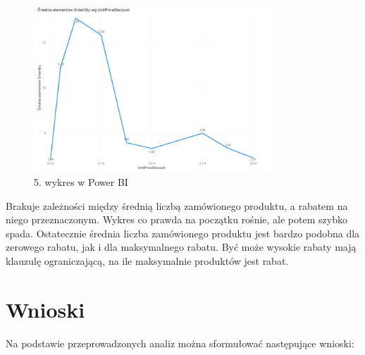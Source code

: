 \documentclass[a4paper,12pt]{article}
\begin{document}
\begin{figure}[H]
    \centering
    \includegraphics[width=0.8\textwidth]{images/power_bi/05.png}
    \caption{5. wykres w Power BI}
\end{figure}

Brakuje zależności między średnią liczbą zamówionego produktu, a rabatem na niego przeznaczonym. Wykres co prawda na początku rośnie, ale potem szybko spada. Ostatecznie średnia liczba zamówionego produktu jest bardzo podobna dla zerowego rabatu, jak i dla maksymalnego rabatu. Być może wysokie rabaty mają klauzulę ograniczającą, na ile maksymalnie produktów jest rabat.

\section{Wnioski}

Na podstawie przeprowadzonych analiz można sformułować następujące wnioski:
\end{document}
